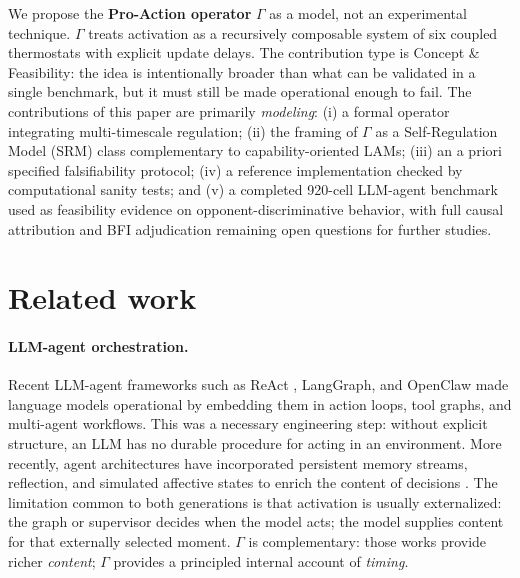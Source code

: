 \documentclass{article}
\begin{document}
We propose the \textbf{Pro-Action operator} $\Gamma$ as a model, not an experimental technique. $\Gamma$ treats activation as a recursively composable system of six coupled thermostats with explicit update delays. The contribution type is Concept \& Feasibility: the idea is intentionally broader than what can be validated in a single benchmark, but it must still be made operational enough to fail. The contributions of this paper are primarily \textit{modeling}: (i) a formal operator integrating multi-timescale regulation; (ii) the framing of $\Gamma$ as a Self-Regulation Model (SRM) class complementary to capability-oriented LAMs; (iii) an a priori specified falsifiability protocol; (iv) a reference implementation checked by computational sanity tests; and (v) a completed 920-cell LLM-agent benchmark used as feasibility evidence on opponent-discriminative behavior, with full causal attribution and BFI adjudication remaining open questions for further studies.

\section{Related work}\label{sec:related}

\paragraph{LLM-agent orchestration.} Recent LLM-agent frameworks such as ReAct \citep{yao2023react}, LangGraph, and OpenClaw made language models operational by embedding them in action loops, tool graphs, and multi-agent workflows. This was a necessary engineering step: without explicit structure, an LLM has no durable procedure for acting in an environment. More recently, agent architectures have incorporated persistent memory streams, reflection, and simulated affective states to enrich the content of decisions \citep{park2023generative,kaiya2023lyfe,wang2023emotional,wang2023voyager}. The limitation common to both generations is that activation is usually externalized: the graph or supervisor decides when the model acts; the model supplies content for that externally selected moment. $\Gamma$ is complementary: those works provide richer \textit{content}; $\Gamma$ provides a principled internal account of \textit{timing}.
\end{document}

